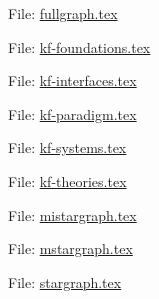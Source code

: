 \documentclass[notes,mh]{mikoslides}
\begin{document}
\begin{center} \LARGE File: \url{fullgraph.tex} \end{center}
 \newpage

\begin{center} \LARGE File: \url{kf-foundations.tex} \end{center}
 \newpage

\begin{center} \LARGE File: \url{kf-interfaces.tex} \end{center}
 \newpage

\begin{center} \LARGE File: \url{kf-paradigm.tex} \end{center}
 \newpage

\begin{center} \LARGE File: \url{kf-systems.tex} \end{center}
 \newpage

\begin{center} \LARGE File: \url{kf-theories.tex} \end{center}
 \newpage

\begin{center} \LARGE File: \url{mistargraph.tex} \end{center}
 \newpage

\begin{center} \LARGE File: \url{mstargraph.tex} \end{center}
 \newpage

\begin{center} \LARGE File: \url{stargraph.tex} \end{center}
 \newpage



\printindex
\end{document}
